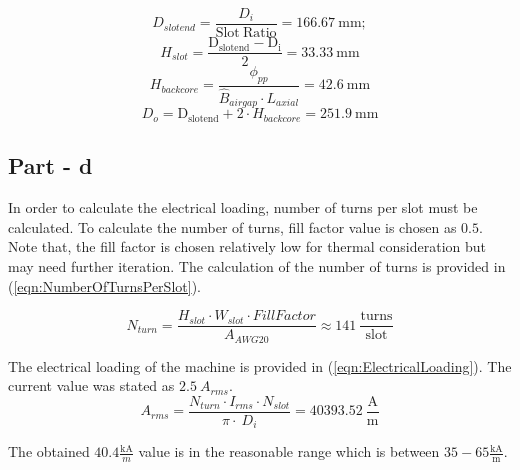 \documentclass{article}
\begin{document}
\begin{equation} \label{eqn:SlotEndDiameter}
    D_{slotend} = \frac{D_i}{\mathrm{Slot \: Ratio}} = 166.67 \: \mathrm{mm};
\end{equation}
\begin{equation} \label{eqn:SlotHeight}
    H_{slot} = \frac{\mathrm{D_{slotend}-D_i}}{2} = 33.33 \: \mathrm{mm}
\end{equation}
\begin{equation} \label{eqn:BackCoreDepth}
    H_{backcore} = \frac{\phi_{pp}}{\hat{B}_{airgap} \cdot L_{axial}} = 42.6 \: \mathrm{mm}
\end{equation}
\begin{equation} \label{eqn:StatorOuterDiameter}
    D_{o} = \mathrm{D_{slotend}} + 2\cdot H_{backcore}= 251.9 \: \mathrm{mm}
\end{equation}

\subsection{Part - d}
In order to calculate the electrical loading, number of turns per slot must be calculated. To calculate the number of turns, fill factor value is chosen as $\pmb{0.5}$. Note that, the fill factor is chosen relatively low for thermal consideration but may need further iteration. The calculation of the number of turns is provided in (\ref{eqn:NumberOfTurnsPerSlot}).

\begin{equation} \label{eqn:NumberOfTurnsPerSlot}
    N_{turn} = \frac{H_{slot} \cdot W_{slot} \cdot FillFactor}{A_{AWG20}} \approx 141 \: \frac{\mathrm{turns}}{\mathrm{slot}}
\end{equation}


The electrical loading of the machine is provided in (\ref{eqn:ElectricalLoading}). The current value was stated as $2.5 \: A_{rms}$. 
\begin{equation} \label{eqn:ElectricalLoading}
    A_{rms} = \frac{N_{turn} \cdot I_{rms} \cdot N_{slot}}{\pi \cdot \: D_i} = 40393.52 \: \mathrm{\frac{\mathrm{A}}{\mathrm{m}}}
\end{equation}



The obtained $40.4 \frac{\mathrm{kA}}{m}$ value is in the reasonable range which is between $35-65 \frac{\mathrm{kA}}{\mathrm{m}}$.
\end{document}
